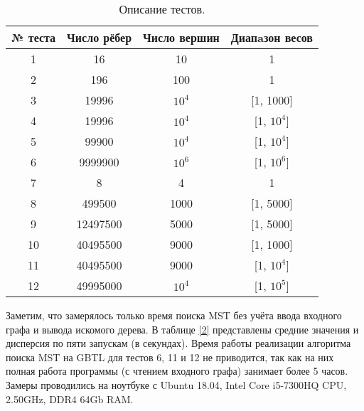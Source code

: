\documentclass[14pt]{matmex-diploma-custom}
\begin{document}
\begin{table}[ht]
\caption{Описание тестов.} \label{3}
\centering
	\begin{tabular}{|c|c|c|c|}\hline
		  № теста & Число рёбер & Число вершин & Диапaзон весов\\\hline
                 1 & 16 & 10 & 1 \\\hline
		 2 & 196 & 100 & 1 \\\hline
                 3 & 19996 & $10^4$ & [1, 1000] \\\hline
		 4 & 19996 & $10^4$ & [1, $10^4$] \\\hline
		 5 & 99900 & $10^4$ & [1, $10^4$] \\\hline
                 6 & 9999900 & $10^6$ & [1, $10^6$] \\\hline\hline
                 7 & 8 & 4 & 1 \\\hline
		 8 & 499500 & 1000 & [1, 5000] \\\hline
		 9 & 12497500 & 5000 & [1, 5000] \\\hline
		 10 & 40495500 & 9000 & [1, 1000] \\\hline
                 11 & 40495500 & 9000 & [1, $10^4$] \\\hline
                 12 & 49995000 & $10^4$ & [1, $10^5$] \\\hline
	\end{tabular}
\end{table}

Заметим, что замерялось только время поиска MST без учёта ввода входного графа и вывода искомого дерева. В таблице \ref{2} представлены средние значения и дисперсия по пяти запускам (в секундах). Время работы реализации алгоритма поиска MST на GBTL для тестов 6, 11 и 12 не приводится, так как на них полная работа программы (с чтением входного графа) занимает более 5 часов. Замеры проводились на ноутбуке с Ubuntu 18.04, Intel Core i5-7300HQ CPU, 2.50GHz, DDR4 64Gb RAM. 
\end{document}
